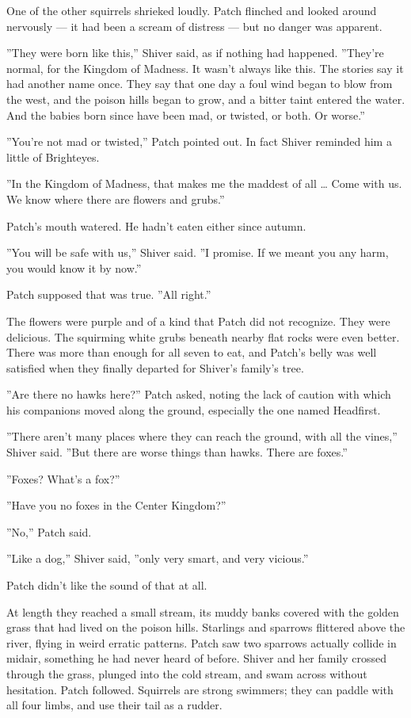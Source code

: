 \documentclass[12pt]{book}
\begin{document}
One of the other squirrels shrieked loudly. Patch flinched and looked
around nervously --- it had been a scream of distress --- but no
danger was apparent.

''They were born like this,'' Shiver said, as if nothing had
happened. ''They're normal, for the Kingdom of Madness. It wasn't
always like this. The stories say it had another name once. They say
that one day a foul wind began to blow from the west, and the poison
hills began to grow, and a bitter taint entered the water. And the
babies born since have been mad, or twisted, or both. Or worse.''

''You're not mad or twisted,'' Patch pointed out. In fact Shiver
reminded him a little of Brighteyes.

''In the Kingdom of Madness, that makes me the maddest of all \ldots{}
Come with us. We know where there are flowers and grubs.''

Patch's mouth watered. He hadn't eaten either since autumn.

''You will be safe with us,'' Shiver said. ''I promise. If we meant
you any harm, you would know it by now.''

Patch supposed that was true. ''All right.''

The flowers were purple and of a kind that Patch did not
recognize. They were delicious. The squirming white grubs beneath
nearby flat rocks were even better. There was more than enough for all
seven to eat, and Patch's belly was well satisfied when they finally
departed for Shiver's family's tree.

''Are there no hawks here?'' Patch asked, noting the lack of caution
with which his companions moved along the ground, especially the one
named Headfirst.

''There aren't many places where they can reach the ground, with all
the vines,'' Shiver said. ''But there are worse things than
hawks. There are foxes.''

''Foxes? What's a fox?''

''Have you no foxes in the Center Kingdom?''

''No,'' Patch said.

''Like a dog,'' Shiver said, ''only very smart, and very vicious.''

Patch didn't like the sound of that at all.

At length they reached a small stream, its muddy banks covered with
the golden grass that had lived on the poison hills. Starlings and
sparrows flittered above the river, flying in weird erratic
patterns. Patch saw two sparrows actually collide in midair, something
he had never heard of before. Shiver and her family crossed through
the grass, plunged into the cold stream, and swam across without
hesitation. Patch followed. Squirrels are strong swimmers; they can
paddle with all four limbs, and use their tail as a rudder.
\end{document}
